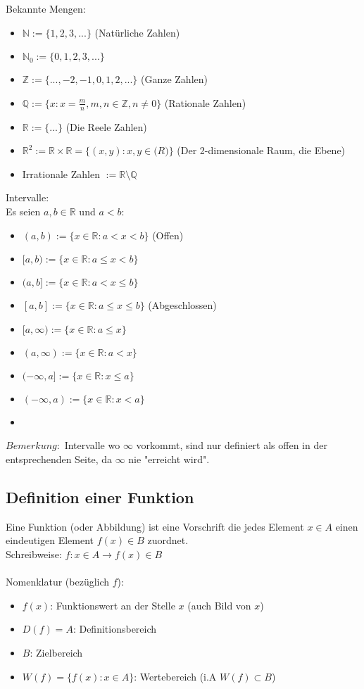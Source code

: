 \documentclass[11pt]{article} %
\begin{document}
Bekannte Mengen:
\begin{itemize} 
\item $\mathbb{N} := \{1,2,3,...\}$ (Natürliche Zahlen)
\item $\mathbb{N}_0:= \{0,1,2,3,...\}$ 
\item $\mathbb{Z} := \{...,-2,-1,0,1,2,...\}$ (Ganze Zahlen)
\item $\mathbb{Q} := \{x: x = \frac{m}{n}, m,n \in \mathbb{Z}, n \neq 0\} $ (Rationale Zahlen) 
\item $\mathbb{R} := \{...\}$ (Die Reele Zahlen)  
\item $\mathbb{R}^2 := \mathbb{R} \times \mathbb{R}=\{(x,y) : x,y \in \mathbb(R)\} $ (Der 2-dimensionale Raum, die Ebene)
\item Irrationale Zahlen $:= \mathbb{R}\setminus \mathbb{Q}$
\end{itemize}

Intervalle:\\
Es seien $a,b \in \mathbb{R}$ und $a < b$:
\begin{itemize}
\item $(a,b):= \{x \in \mathbb{R}: a<x<b\}$ (Offen)
\item $[a,b):= \{x \in \mathbb{R}: a\leq x<b\}$
\item $(a,b]:= \{x \in \mathbb{R}: a<x \leq b\}$
\item $[a,b]:= \{x \in \mathbb{R}: a\leq x \leq b\}$ (Abgeschlossen)
\item $[a,\infty):= \{x \in \mathbb{R}: a\leq x\}$
\item $(a,\infty):= \{x \in \mathbb{R}: a < x\}$
\item $(-\infty,a]:= \{x \in \mathbb{R}: x \leq a\}$
\item $(-\infty,a):= \{x \in \mathbb{R}: x < a\}$
\item
\end{itemize}

$Bemerkung:$ Intervalle wo $\infty$ vorkommt, sind nur definiert als offen in der entsprechenden Seite, da $\infty$ nie "erreicht wird". 

\subsection{Definition einer Funktion}

Eine Funktion (oder Abbildung) ist eine Vorschrift die jedes Element $x \in A$ einen eindeutigen Element $f(x) \in B$ zuordnet.\\
Schreibweise: $f: x \in A \rightarrow f(x) \in B$\\\\
Nomenklatur (bezüglich $f$):
\begin{itemize}
\item$f(x)$: Funktionswert an der Stelle $x$ (auch Bild von $x$)
\item $D(f) = A$: Definitionsbereich
\item $B$: Zielbereich
\item $W(f) = \{ f(x) : x \in A\}$: Wertebereich (i.A $W(f) \subset B$)
\end{itemize}
\end{document}
